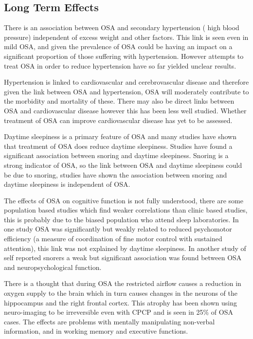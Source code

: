 \subsection{Long Term Effects}

There is an association between OSA and secondary hypertension ( high blood pressure) independent of excess weight and other factors. This link is seen even in mild OSA, and given the prevalence of OSA could be having an impact on a significant proportion of those suffering with hypertension. However attempts to treat OSA in order to reduce hypertension have so far yielded unclear results. 

Hypertension is linked to cardiovascular and cerebrovascular disease and therefore given the link between OSA and hypertension, OSA will moderately contribute to the morbidity and mortality of these. There may also be direct links between OSA and cardiovascular disease however this has been less well studied. Whether treatment of OSA can improve cardiovascular disease has yet to be assessed. 

Daytime sleepiness is a primary feature of OSA and many studies have shown that treatment of OSA does reduce daytime sleepiness. Studies have found a significant association between snoring and daytime sleepiness. Snoring is a strong indicator of OSA, so the link between OSA and daytime sleepiness could be due to snoring, studies have shown the association between snoring and daytime sleepiness is independent of OSA. 

The effects of OSA on cognitive function is not fully understood, there are some population based studies which find weaker correlations than clinic based studies, this is probably due to the biased population who attend sleep laboratories. In one study OSA was significantly but weakly related to reduced psychomotor efficiency (a measure of coordination of fine motor control with sustained attention), this link was not explained by daytime sleepiness. In another study of self reported snorers a weak but significant association was found between OSA and neuropsychological function.

There is a thought that during OSA the restricted airflow causes a reduction in oxygen supply to the brain which in turn causes changes in the neurons of the hippocampus and the right frontal cortex. This atrophy has been shown using neuro-imaging to be irreversible even with CPCP and is seen in 25\% of OSA cases. The effects are problems with mentally manipulating non-verbal information, and in working memory and executive functions. 

